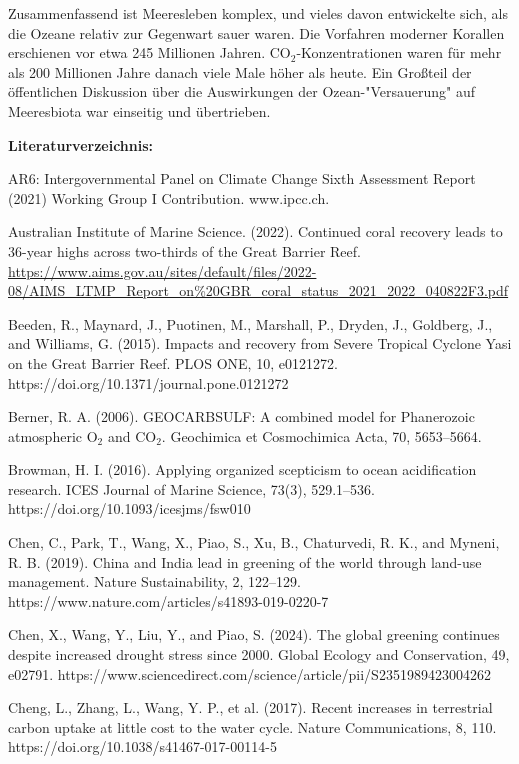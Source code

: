 \documentclass[12pt,paper=a4,DIV=12,parskip=never,chapterprefix=false,headings=standardclasses]{scrreprt}
\begin{document}
Zusammenfassend ist Meeresleben komplex, und vieles davon entwickelte sich, als die Ozeane relativ zur Gegenwart sauer waren. Die Vorfahren moderner Korallen erschienen vor etwa 245 Millionen Jahren. CO$_2$-Konzentrationen waren für mehr als 200 Millionen Jahre danach viele Male höher als heute. Ein Großteil der öffentlichen Diskussion über die Auswirkungen der Ozean-"Versauerung" auf Meeresbiota war einseitig und übertrieben.

\vfill
\noindent\textbf{Literaturverzeichnis:}

\begingroup
\parindent=0pt
\everypar{\hangindent=2em\hangafter=1\relax}

AR6: Intergovernmental Panel on Climate Change Sixth Assessment Report (2021) Working Group I Contribution. www.ipcc.ch.

Australian Institute of Marine Science. (2022). Continued coral recovery leads to 36-year highs across two-thirds of the Great Barrier Reef. \url{https://www.aims.gov.au/sites/default/files/2022-08/AIMS_LTMP_Report_on\%20GBR_coral_status_2021_2022_040822F3.pdf}

Beeden, R., Maynard, J., Puotinen, M., Marshall, P., Dryden, J., Goldberg, J., and Williams, G. (2015). Impacts and recovery from Severe Tropical Cyclone Yasi on the Great Barrier Reef. PLOS ONE, 10, e0121272. https://doi.org/10.1371/journal.pone.0121272

Berner, R. A. (2006). GEOCARBSULF: A combined model for Phanerozoic atmospheric O$_2$ and CO$_2$. Geochimica et Cosmochimica Acta, 70, 5653–5664.

Browman, H. I. (2016). Applying organized scepticism to ocean acidification research. ICES Journal of Marine Science, 73(3), 529.1–536. https://doi.org/10.1093/icesjms/fsw010

Chen, C., Park, T., Wang, X., Piao, S., Xu, B., Chaturvedi, R. K., and Myneni, R. B. (2019). China and India lead in greening of the world through land-use management. Nature Sustainability, 2, 122–129. https://www.nature.com/articles/s41893-019-0220-7

Chen, X., Wang, Y., Liu, Y., and Piao, S. (2024). The global greening continues despite increased drought stress since 2000. Global Ecology and Conservation, 49, e02791. https://www.sciencedirect.com/science/article/pii/S2351989423004262

Cheng, L., Zhang, L., Wang, Y. P., et al. (2017). Recent increases in terrestrial carbon uptake at little cost to the water cycle. Nature Communications, 8, 110. https://doi.org/10.1038/s41467-017-00114-5
\end{document}
